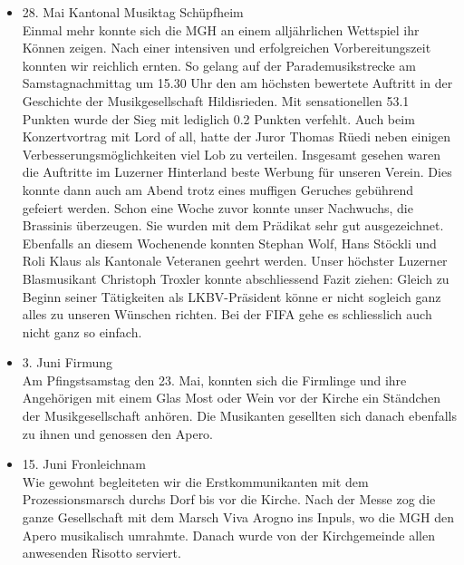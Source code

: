 \begin{history}
\begin{itemize}
            \item  28. Mai Kantonal Musiktag Schüpfheim\\
                  Einmal mehr konnte sich die MGH an einem alljährlichen Wettspiel
                  ihr Können zeigen. Nach einer intensiven und erfolgreichen
                  Vorbereitungszeit konnten wir reichlich ernten. So gelang auf der
                  Parademusikstrecke am Samstagnachmittag um 15.30 Uhr den am
                  höchsten bewertete Auftritt in der Geschichte der Musikgesellschaft
                  Hildisrieden. Mit sensationellen 53.1 Punkten wurde der Sieg mit
                  lediglich 0.2 Punkten verfehlt. Auch beim Konzertvortrag mit Lord
                  of all, hatte der Juror Thomas Rüedi neben einigen
                  Verbesserungsmöglichkeiten viel Lob zu verteilen. Insgesamt
                  gesehen waren die Auftritte im Luzerner Hinterland beste Werbung
                  für unseren Verein. Dies konnte dann auch am Abend trotz eines
                  muffigen Geruches gebührend gefeiert werden. Schon eine Woche
                  zuvor konnte unser Nachwuchs, die Brassinis überzeugen. Sie wurden
                  mit dem Prädikat sehr gut ausgezeichnet. Ebenfalls an diesem
                  Wochenende konnten Stephan Wolf, Hans Stöckli und Roli Klaus als
                  Kantonale Veteranen geehrt werden. Unser höchster Luzerner
                  Blasmusikant Christoph Troxler konnte abschliessend Fazit ziehen:
                  Gleich zu Beginn seiner Tätigkeiten als LKBV-Präsident könne er
                  nicht sogleich ganz alles zu unseren Wünschen richten. Bei der
                  FIFA gehe es schliesslich auch nicht ganz so einfach.

            \item 3. Juni Firmung\\
                  Am Pfingstsamstag den 23. Mai, konnten sich die Firmlinge und ihre
                  Angehörigen mit einem Glas Most oder Wein vor der Kirche ein
                  Ständchen der Musikgesellschaft anhören. Die Musikanten gesellten
                  sich danach ebenfalls zu ihnen und genossen den Apero.

            \item 15. Juni Fronleichnam\\
                  Wie gewohnt begleiteten wir die Erstkommunikanten mit dem
                  Prozessionsmarsch durchs Dorf bis vor die Kirche. Nach der Messe
                  zog die ganze Gesellschaft mit dem Marsch Viva Arogno ins Inpuls,
                  wo die MGH den Apero musikalisch umrahmte. Danach wurde von der
                  Kirchgemeinde allen anwesenden Risotto serviert.


\end{itemize}
\end{history}
